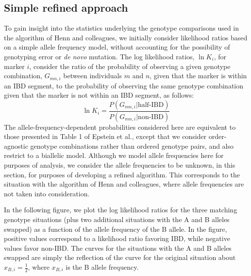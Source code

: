 \documentclass{article}
\begin{document}
\subsection{Simple refined approach}
To gain insight into the statistics underlying the genotype comparisons used in the algorithm of Henn and colleagues, we initially consider likelihood ratios based on a simple allele frequency model, without accounting for the possibility of genotyping error or \textit{de novo} mutation. The log likelihood ratios, $\ln K_i$, for marker $i$, consider the ratio of the probability of observing a given genotype combination, $G_{mn,i}$ between individuals $m$ and $n$, given that the marker is within an IBD segment, to the probability of observing the same genotype combination given that the marker is not within an IBD segment, as follows:
\begin{equation}
  \ln K_i = \frac{P(G_{mn,i} | \text{half-IBD})}{P(G_{mn,i} | \text{non-IBD})}
\end{equation}
The allele-frequency-dependent probabilities considered here are equivalent to those presented in Table 1 of Epstein et al.,\citep{RELPAIR} except that we consider order-agnostic genotype combinations rather than ordered genotype pairs, and also restrict to a biallelic model. Although we model allele frequencies here for purposes of analysis, we consider the allele frequencies to be unknown, in this section, for purposes of developing a refined algorithm. This corresponds to the situation with the algorithm of Henn and colleagues, where allele frequencies are not taken into consideration.

In the following figure, we plot the log likelihood ratios for the three matching genotype situations (plus two additional situations with the A and B alleles swapped) as a function of the allele frequency of the B allele. In the figure, positive values correspond to a likelihood ratio favoring IBD, while negative values favor non-IBD. The curves for the situations with the A and B alleles swapped are simply the reflection of the curve for the original situation about $x_{B,i}=\frac{1}{2}$, where $x_{B,i}$ is the B allele frequency.
\end{document}
